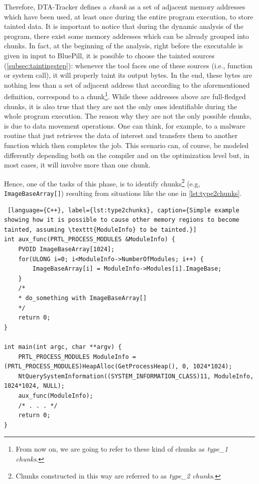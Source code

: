 \documentclass[LaM,binding=0.6cm]{sapthesis}
\begin{document}
\smallskip
Therefore, {\sf DTA-Tracker} defines a \textit{chunk} as a set of adjacent memory addresses which have been used, at least once during the entire program execution, to store tainted data. It is important to notice that during the dynamic analysis of the program, there exist some memory addresses which can be already grouped into chunks. In fact, at the beginning of the analysis, right before the executable is given in input to BluePill, it is possible to choose the tainted sources (\autoref{subsec:taintingstep}): whenever the tool faces one of these sources (i.e., function or system call), it will properly taint its output bytes. In the end, these bytes are nothing less than a set of adjacent address that according to the aforementioned definition, correspond to a chunk\footnote{From now on, we are going to refer to these kind of chunks as \textit{type\_1 chunks}.}.
While these addresses above are full-fledged chunks, it is also true that they are not the only ones identifiable during the whole program execution. The reason why they are not the only possible chunks, is due to data movement operations. One can think, for example, to a malware routine that just retrieves the data of interest and transfers them to another function which then completes the job. This scenario can, of course, be modeled differently depending both on the compiler and on the optimization level but, in most cases, it will involve more than one chunk.

Hence, one of the tasks of this phase, is to identify chunks\footnote{Chunks constructed in this way are referred to as \textit{type\_2 chunks}.} (e.g, \texttt{ImageBaseArray[]}) resulting from situations like the one in \autoref{lst:type2chunks}.

\begin{lstlisting} [language={C++}, label={lst:type2chunks}, caption={Simple example showing how it is possible to cause other memory regions to become tainted, assuming \texttt{ModuleInfo} to be tainted.}]
int aux_func(PRTL_PROCESS_MODULES &ModuleInfo) {
	PVOID ImageBaseArray[1024];
	for(ULONG i=0; i<ModuleInfo->NumberOfModules; i++) {
		ImageBaseArray[i] = ModuleInfo->Modules[i].ImageBase;
	}
	/*
	* do_something with ImageBaseArray[]
	*/
	return 0;
}

int main(int argc, char **argv) {
	PRTL_PROCESS_MODULES ModuleInfo = (PRTL_PROCESS_MODULES)HeapAlloc(GetProcessHeap(), 0, 1024*1024);
	NtQuerySystemInformation((SYSTEM_INFORMATION_CLASS)11, ModuleInfo, 1024*1024, NULL);
	aux_func(ModuleInfo);
	/* . . . */
	return 0;
}

\end{lstlisting}
\end{document}
